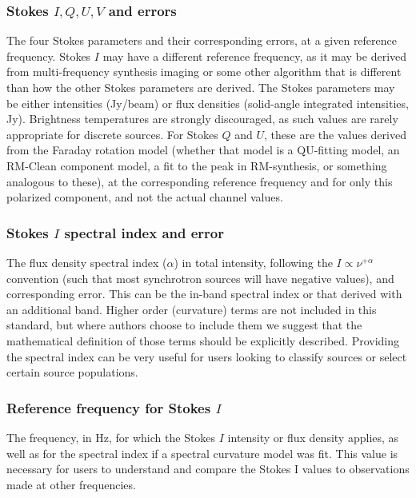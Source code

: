 \documentclass[10pt,modern]{aastex63}
\begin{document}
\subsubsection{Stokes $I, Q, U, V$ and errors}
The four Stokes parameters and their corresponding errors, at a given reference frequency. Stokes $I$ may have a different reference frequency, as it may be derived from multi-frequency synthesis imaging or some other algorithm that is different than how the other Stokes parameters are derived. The Stokes parameters may be either intensities (Jy/beam) or flux densities (solid-angle integrated intensities, Jy). Brightness temperatures are strongly discouraged, as such values are rarely appropriate for discrete sources. For Stokes $Q$ and $U$, these are the values derived from the Faraday rotation model (whether that model is a QU-fitting model, an RM-Clean \citep{Heald09} component model, a fit to the peak in RM-synthesis, or something analogous to these), at the corresponding reference frequency and for only this polarized component, and not the actual channel values.

\subsubsection{Stokes $I$ spectral index and error}
The flux density spectral index ($\alpha$) in total intensity, following the $I \propto \nu^{+\alpha}$ convention (such that most synchrotron sources will have negative values), and corresponding error. This can be the in-band spectral index or that derived with an additional band. Higher order (curvature) terms are not included in this standard, but where authors choose to include them we suggest that the mathematical definition of those terms should be explicitly described. Providing the spectral index can be very useful for users looking to classify sources or select certain source populations.

\subsubsection{Reference frequency for Stokes $I$}
The frequency, in Hz, for which the Stokes $I$ intensity or flux density applies, as well as for the spectral index if a spectral curvature model was fit. This value is necessary for users to understand and compare the Stokes I values to observations made at other frequencies.
\end{document}
